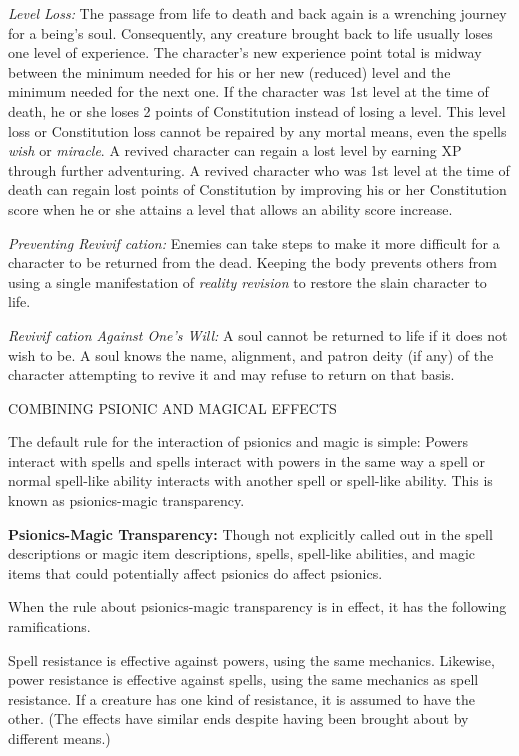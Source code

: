 \documentclass{article}
\begin{document}
\textit{Level Loss: }The passage from life to death and back again is a wrenching 
journey for a being's soul. Consequently, any creature brought back to life usually 
loses one level of experience. The character's new experience point total is midway 
between the minimum needed for his or her new (reduced) level and the minimum needed 
for the next one. If the character was 1st level at the time of death, he or she 
loses 2 points of Constitution instead of losing a level. This level loss or Constitution 
loss cannot be repaired by any mortal means, even the spells \textit{wish }or \textit{miracle}. 
A revived character can regain a lost level by earning XP through further adventuring. 
A revived character who was 1st level at the time of death can regain lost points 
of Constitution by improving his or her Constitution score when he or she attains 
a level that allows an ability score increase.

\textit{Preventing Revivif cation: }Enemies can take steps to make it more difficult 
for a character to be returned from the dead. Keeping the body prevents others 
from using a single manifestation of \textit{reality revision }to restore the slain 
character to life.

\textit{Revivif cation Against One's Will: }A soul cannot be returned to life if 
it does not wish to be. A soul knows the name, alignment, and patron deity (if 
any) of the character attempting to revive it and may refuse to return on that 
basis.

\vspace{12pt}
COMBINING PSIONIC AND MAGICAL EFFECTS

The default rule for the interaction of psionics and magic is simple: Powers interact 
with spells and spells interact with powers in the same way a spell or normal spell-like 
ability interacts with another spell or spell-like ability. This is known as psionics-magic 
transparency.

\textbf{Psionics-Magic Transparency:} Though not explicitly called out in the spell 
descriptions or magic item descriptions\textit{, }spells, spell-like abilities, 
and magic items that could potentially affect psionics do affect psionics. 

When the rule about psionics-magic transparency is in effect, it has the following 
ramifications.

Spell resistance is effective against powers, using the same mechanics. Likewise, 
power resistance is effective against spells, using the same mechanics as spell 
resistance. If a creature has one kind of resistance, it is assumed to have the 
other. (The effects have similar ends despite having been brought about by different 
means.)
\end{document}
